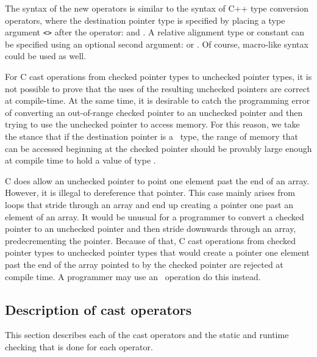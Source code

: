 The syntax of the new operators is similar to the syntax of C++ type
conversion operators, where the destination pointer type is specified by
placing a type argument \texttt{<>} after the operator: 
and .   A relative alignment type or constant can be
specified using an optional second argument:  
 or .
Of course, macro-like syntax could be used as well.

For C cast operations from checked pointer types to unchecked pointer types,
it is not possible to prove that the uses of the resulting unchecked pointers
are correct at compile-time.   At the same
time, it is desirable to  catch the programming error of converting an out-of-range
checked pointer to an unchecked pointer and then trying to use the unchecked
pointer to access memory.  For this reason, we take the stance that if the
destination pointer is a \uncheckedptrT\ type, the range of memory that can be accessed
beginning at the checked pointer should be provably large enough at compile time
to hold a value of type .

C does allow an unchecked pointer to point one element past the end of an array.
However, it is illegal to dereference that pointer.  This case mainly arises
from loops that stride through an array and end up creating a pointer one past
an element of an array.  It would be unusual for a programmer to
convert a checked pointer to an unchecked pointer and then stride downwards through an array,
predecrementing the pointer.  Because of that, C cast operations from checked pointer
types to unchecked pointer types that would create a pointer one element past
the end of the array pointed to by the checked pointer are rejected at compile time.
A programmer may use an \assumeboundscast\ operation do this instead.

\subsection{Description of cast operators}

This section describes each of the cast operators and the static
and runtime checking that is done for each operator.   

